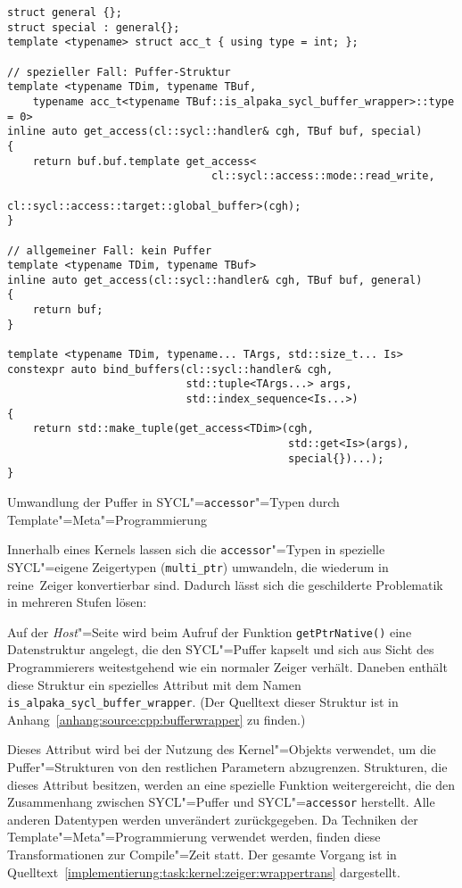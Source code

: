 \begin{code}
    \begin{verbatim}
struct general {};
struct special : general{};
template <typename> struct acc_t { using type = int; };

// spezieller Fall: Puffer-Struktur
template <typename TDim, typename TBuf,
    typename acc_t<typename TBuf::is_alpaka_sycl_buffer_wrapper>::type = 0>
inline auto get_access(cl::sycl::handler& cgh, TBuf buf, special)
{
    return buf.buf.template get_access<
                                cl::sycl::access::mode::read_write,
                                cl::sycl::access::target::global_buffer>(cgh);
}

// allgemeiner Fall: kein Puffer
template <typename TDim, typename TBuf>
inline auto get_access(cl::sycl::handler& cgh, TBuf buf, general)
{
    return buf;
}

template <typename TDim, typename... TArgs, std::size_t... Is>
constexpr auto bind_buffers(cl::sycl::handler& cgh,
                            std::tuple<TArgs...> args,
                            std::index_sequence<Is...>)
{
    return std::make_tuple(get_access<TDim>(cgh,
                                            std::get<Is>(args),
                                            special{})...);
}
    \end{verbatim}
    \caption{Umwandlung der Puffer in SYCL"=\texttt{accessor}"=Typen durch
             Template"=Meta"=Programmierung}
    \label{implementierung:task:kernel:zeiger:wrappertrans}
\end{code}
\vspace{3mm}
Innerhalb eines Kernels lassen sich die \texttt{accessor}"=Typen in spezielle
SYCL"=eigene Zeigertypen (\texttt{multi\_ptr}) umwandeln, die wiederum in
\glqq reine\grqq\ Zeiger konvertierbar sind. Dadurch lässt sich die geschilderte
Problematik in mehreren Stufen lösen:

Auf der \textit{Host}"=Seite wird beim Aufruf der Funktion
\texttt{getPtrNative()} eine Datenstruktur angelegt, die den SYCL"=Puffer
kapselt und sich aus Sicht des Programmierers weitestgehend wie ein normaler
Zeiger verhält. Daneben enthält diese Struktur ein spezielles Attribut mit dem
Namen \texttt{is\_alpaka\_sycl\_buffer\_wrapper}. (Der Quelltext dieser Struktur
ist in Anhang~\ref{anhang:source:cpp:bufferwrapper} zu finden.)

Dieses Attribut wird bei der Nutzung des Kernel"=Objekts verwendet, um die
Puffer"=Strukturen von den restlichen Parametern abzugrenzen. Strukturen, die
dieses Attribut besitzen, werden an eine spezielle Funktion weitergereicht, die
den Zusammenhang zwischen SYCL"=Puffer und SYCL"=\texttt{accessor} herstellt.
Alle anderen Datentypen werden unverändert zurückgegeben. Da Techniken der
Template"=Meta"=Programmierung verwendet werden, finden diese Transformationen
zur Compile"=Zeit statt. Der gesamte Vorgang ist in
Quelltext~\ref{implementierung:task:kernel:zeiger:wrappertrans} dargestellt.


